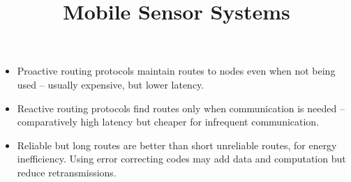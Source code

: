 \documentclass[a4paper, 11pt]{article}
\title{\vspace{-2cm}Mobile Sensor Systems\vspace{-1.5cm}}
\author{}
\date{}
\begin{document}
\maketitle

\begin{itemize}
\item Proactive routing protocols maintain routes to nodes even when not being used -- usually expensive, but lower latency.
\item Reactive routing protocols find routes only when communication is needed -- comparatively high latency but cheaper for infrequent communication.
\item Reliable but long routes are better than short unreliable routes, for energy inefficiency. Using error correcting codes may add data and computation but reduce retransmissions.
\end{itemize}
\end{document}
